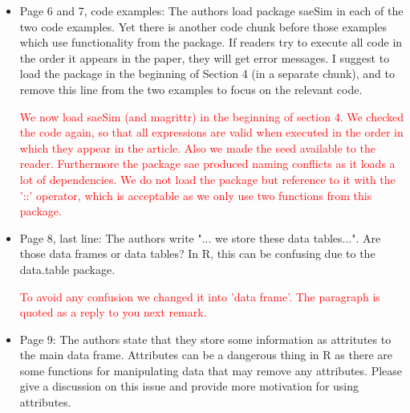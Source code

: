\documentclass[11pt]{article}
\begin{document}
\begin{itemize}
\item
	Page 6 and 7, code examples: The authors load package saeSim in each of the two code examples. Yet there is another code chunk before those examples which use functionality from the package. If readers try to execute all code in the order it appears in the paper, they will get error messages. I suggest to load the package in the beginning of Section 4 (in a separate chunk), and to remove this line from the two examples to focus on the relevant code. 
	
	\textcolor{red}{We now load saeSim (and magrittr) in the beginning of section 4. We checked the code again, so that all expressions are valid when executed in the order in which they appear in the article. Also we made the seed available to the reader. Furthermore the package sae produced naming conflicts as it loads a lot of dependencies. We do not load the package but reference to it with the '::' operator, which is acceptable as we only use two functions from this package.}

\item
	Page 8, last line: The authors write "... we store these data tables...". Are those data frames or data tables? In R, this can be confusing due to the data.table package. 
	
	\textcolor{red}{To avoid any confusion we changed it into 'data frame'. The paragraph is quoted as a reply to you next remark.}

\item
	Page 9: The authors state that they store some information as attritutes to the main data frame. Attributes can be a dangerous thing in R as there are some functions for manipulating data that may remove any attributes. Please give a discussion on this issue and provide more motivation for using attributes. 
	

\end{itemize}
\end{document}
